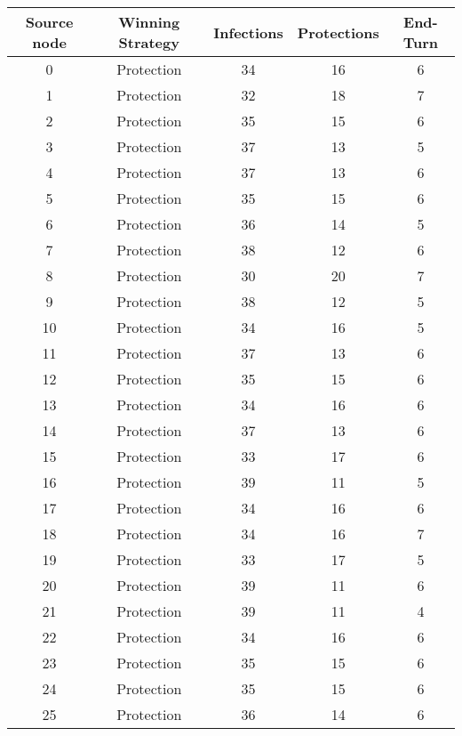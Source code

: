 \documentclass[results.tex]{subfiles}
\begin{document}
\begin{center}
  \begin{tabular}{| c || c | c | c | c |}
    \hline
    {\bfseries Source node} & {\bfseries Winning Strategy} & {\bfseries Infections} & {\bfseries Protections} & {\bfseries End-Turn} \\  %
    \hline\hline
    0 & Protection & 34 & 16 & 6 \\ 
    \hline
    1 & Protection & 32 & 18 & 7 \\ 
    \hline
    2 & Protection & 35 & 15 & 6 \\ 
    \hline
    3 & Protection & 37 & 13 & 5 \\ 
    \hline
    4 & Protection & 37 & 13 & 6 \\ 
    \hline
    5 & Protection & 35 & 15 & 6 \\ 
    \hline
    6 & Protection & 36 & 14 & 5 \\ 
    \hline
    7 & Protection & 38 & 12 & 6 \\ 
    \hline
    8 & Protection & 30 & 20 & 7 \\ 
    \hline
    9 & Protection & 38 & 12 & 5 \\ 
    \hline
    10 & Protection & 34 & 16 & 5 \\ 
    \hline
    11 & Protection & 37 & 13 & 6 \\ 
    \hline
    12 & Protection & 35 & 15 & 6 \\ 
    \hline
    13 & Protection & 34 & 16 & 6 \\ 
    \hline
    14 & Protection & 37 & 13 & 6 \\ 
    \hline
    15 & Protection & 33 & 17 & 6 \\ 
    \hline
    16 & Protection & 39 & 11 & 5 \\ 
    \hline
    17 & Protection & 34 & 16 & 6 \\ 
    \hline
    18 & Protection & 34 & 16 & 7 \\ 
    \hline
    19 & Protection & 33 & 17 & 5 \\ 
    \hline
    20 & Protection & 39 & 11 & 6 \\ 
    \hline
    21 & Protection & 39 & 11 & 4 \\ 
    \hline
    22 & Protection & 34 & 16 & 6 \\ 
    \hline
    23 & Protection & 35 & 15 & 6 \\ 
    \hline
    24 & Protection & 35 & 15 & 6 \\ 
    \hline
    25 & Protection & 36 & 14 & 6 \\ 

\end{tabular}
\end{center}
\end{document}
